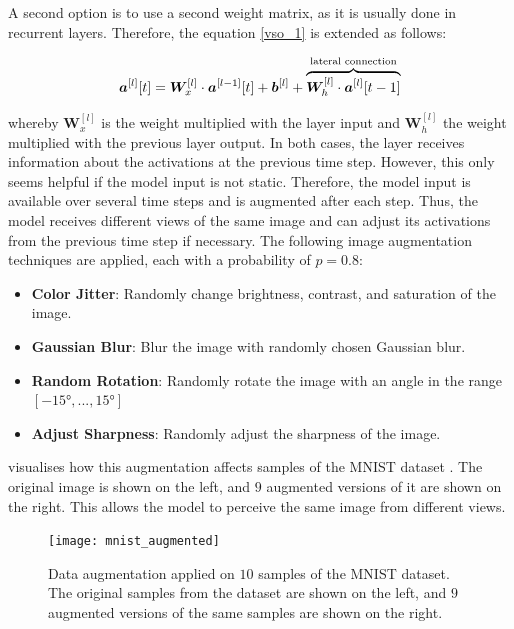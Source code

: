 A second option is to use a second weight matrix, as it is usually done in recurrent layers. Therefore, the equation \eqref{vso_1} is extended as follows:

\begin{align}\eqlbl{vso_13}
		\boldsymbol{a}^{[l]}[t] =  \boldsymbol{W}_x^{[l]} \cdot \boldsymbol{a}^{[l-1]}[t] + \boldsymbol{b}^{[l]} + \overbrace{\boldsymbol{W}_h^{[l]} \cdot \boldsymbol{a}^{[l]}[t-1] }^{\text{lateral connection}}
\end{align}

whereby $\boldsymbol{W}_x^{[l]}$ is the weight multiplied with the layer input and $\boldsymbol{W}_h^{[l]}$ the weight multiplied with the previous layer output. In both cases, the layer receives information about the activations at the previous time step.
However, this only seems helpful if the model input is not static. Therefore, the model input is available over several time steps and is augmented after each step. Thus, the model receives different views of the same image and can adjust its activations from the previous time step if necessary. The following image augmentation techniques are applied, each with a probability of $p=0.8$:

\begin{itemize}
	\item \textbf{Color Jitter}: Randomly change brightness, contrast, and saturation of the image.
	\item \textbf{Gaussian Blur}: Blur the image with randomly chosen Gaussian blur.
	\item \textbf{Random Rotation}: Randomly rotate the image with an angle in the range $[-15°, ..., 15°]$
	\item \textbf{Adjust Sharpness}: Randomly adjust the sharpness of the image.
\end{itemize}

 visualises how this augmentation affects samples of the MNIST dataset \cite{Lecun_Bottou_Bengio_Haffner_1998}. The original image is shown on the left, and $9$ augmented versions of it are shown on the right. This allows the model to perceive the same image from different views.

\begin{figure}[h]
    \centering
    \texttt{[image: mnist\_augmented]}
    \caption[Data augmentation applied on $10$ samples of the MNIST dataset]{Data augmentation applied on $10$ samples of the MNIST dataset. The original samples from the dataset are shown on the left, and $9$ augmented versions of the same samples are shown on the right.}
\end{figure}


